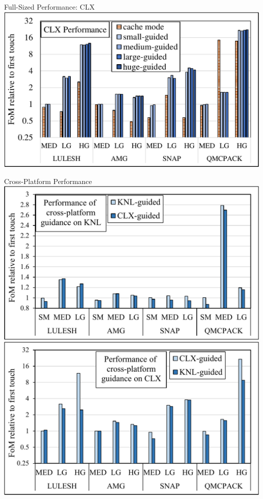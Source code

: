 \documentclass[final,hyperref={pdfpagelabels=false}]{beamer}
\begin{document}
\begin{frame}{Full-Sized Performance: CLX}
  \centering
  \includegraphics[width=.9\textwidth]{figures/aep_perf.pdf}
\end{frame}

\begin{frame}{Cross-Platform Performance}
  \centering
  \includegraphics[width=.6\textwidth]{figures/knl_cross.pdf}
  \\
  \includegraphics[width=.6\textwidth]{figures/aep_cross.pdf}
\end{frame}
\end{document}
